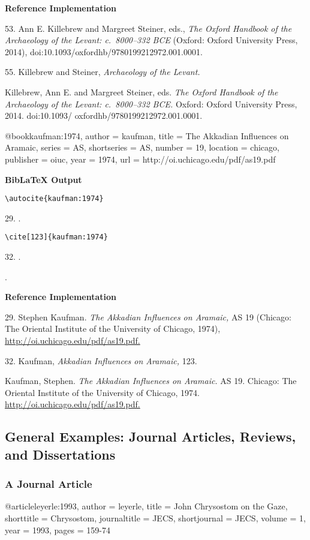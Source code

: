 \documentclass[a4paper]{article}
\newcommand\citetestnpf[4]{%
  {\textbf{BibLaTeX Output}\par
   \nobreak
   \texttt{\textbackslash autocite\{#4\}}\par
   \color{biblatex-colour}
   #1. \cite{#4}.\par
   \color{black}
   \texttt{\textbackslash cite[#3]\{#4\}}\par
   \color{biblatex-colour}
   #2. \cite[#3]{#4}.\par
   \hangindent\bibindent\bibentrycite{#4}.\par}}
\newenvironment{refimp}{%
  \begin{minipage}{\linewidth}
    \setlength{\parskip}{1ex}
    \textbf{Reference Implementation}\par
    \nobreak
    \color{reference-colour}
}{\end{minipage}}
\newenvironment{vb}{%
  \setlength{\parskip}{0pt}
  \verbatim}{\endverbatim}
\begin{document}
\begin{refimp}
  53. Ann E. Killebrew and Margreet Steiner, eds., \emph{The Oxford Handbook
  of the Archaeology of the Levant: c.~8000–332 BCE} (Oxford: Oxford
  University Press, 2014), doi:10.1093/oxfordhb/9780199212972.001.0001.

  55. Killebrew and Steiner, \emph{Archaeology of the Levant.}

  \hangindent\bibindent Killebrew, Ann E. and Margreet Steiner, eds. \emph{The
  Oxford Handbook of the Archaeology of the Levant: c.~8000–332 BCE.} Oxford:
  Oxford University Press, 2014. doi:10.1093/ oxfordhb/9780199212972.001.0001.
\end{refimp}

\begin{vb}
@book{kaufman:1974,
  author = kaufman,
  title = {The Akkadian Influences on Aramaic},
  series = AS,
  shortseries = {AS},
  number = {19},
  location = chicago,
  publisher = oiuc,
  year = {1974},
  url = {http://oi.uchicago.edu/pdf/as19.pdf}
}
\end{vb}

\citetestnpf{29}{32}{123}{kaufman:1974}

\begin{refimp}
  29. Stephen Kaufman. \emph{The Akkadian Influences on Aramaic,} AS 19
  (Chicago: The Oriental Institute of the University of Chicago, 1974),
  \url{http://oi.uchicago.edu/pdf/as19.pdf.}

  32. Kaufman, \emph{Akkadian Influences on Aramaic,} 123.

  \hangindent\bibindent Kaufman, Stephen. \emph{The Akkadian Influences on
  Aramaic.} AS 19. Chicago: The Oriental Institute of the University of
  Chicago, 1974. \url{http://oi.uchicago.edu/pdf/as19.pdf.}
\end{refimp}

\subsection{General Examples: Journal Articles, Reviews, and Dissertations}

\subsubsection{A Journal Article}

\begin{vb}
@article{leyerle:1993,
  author = leyerle,
  title = {John Chrysostom on the Gaze},
  shorttitle = {Chrysostom},
  journaltitle = JECS,
  shortjournal = {JECS},
  volume = {1},
  year = {1993},
  pages = {159-74}
}
\end{vb}  
\end{document}
